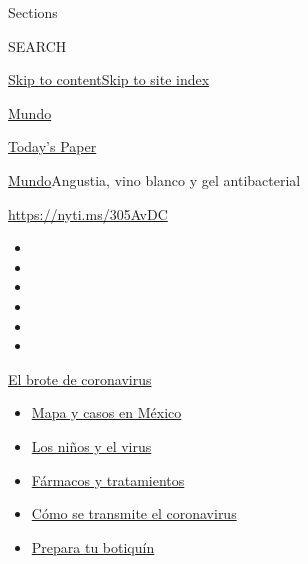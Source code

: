 Sections

SEARCH

\protect\hyperlink{site-content}{Skip to
content}\protect\hyperlink{site-index}{Skip to site index}

\href{https://www.nytimes3xbfgragh.onion/es/section/mundo}{Mundo}

\href{https://myaccount.nytimes3xbfgragh.onion/auth/login?response_type=cookie\&client_id=vi}{}

\href{https://www.nytimes3xbfgragh.onion/section/todayspaper}{Today's
Paper}

\href{/es/section/mundo}{Mundo}\textbar{}Angustia, vino blanco y gel
antibacterial

\url{https://nyti.ms/305AvDC}

\begin{itemize}
\item
\item
\item
\item
\item
\item
\end{itemize}

\href{https://www.nytimes3xbfgragh.onion/es/spotlight/coronavirus?action=click\&pgtype=Article\&state=default\&region=TOP_BANNER\&context=storylines_menu}{El
brote de coronavirus}

\begin{itemize}
\tightlist
\item
  \href{https://www.nytimes3xbfgragh.onion/es/interactive/2020/espanol/america-latina/coronavirus-en-mexico.html?action=click\&pgtype=Article\&state=default\&region=TOP_BANNER\&context=storylines_menu}{Mapa
  y casos en México}
\item
  \href{https://www.nytimes3xbfgragh.onion/es/2020/07/31/espanol/ciencia-y-tecnologia/ninos-contagio-coronavirus.html?action=click\&pgtype=Article\&state=default\&region=TOP_BANNER\&context=storylines_menu}{Los
  niños y el virus}
\item
  \href{https://www.nytimes3xbfgragh.onion/es/interactive/2020/science/coronavirus-tratamientos-curas.html?action=click\&pgtype=Article\&state=default\&region=TOP_BANNER\&context=storylines_menu}{Fármacos
  y tratamientos}
\item
  \href{https://www.nytimes3xbfgragh.onion/es/2020/07/06/espanol/ciencia-y-tecnologia/coronavirus-transmision-aire.html?action=click\&pgtype=Article\&state=default\&region=TOP_BANNER\&context=storylines_menu}{Cómo
  se transmite el coronavirus}
\item
  \href{https://www.nytimes3xbfgragh.onion/es/2020/07/14/espanol/estilos-de-vida/botiquin-medicina-coronavirus.html?action=click\&pgtype=Article\&state=default\&region=TOP_BANNER\&context=storylines_menu}{Prepara
  tu botiquín}
\end{itemize}

